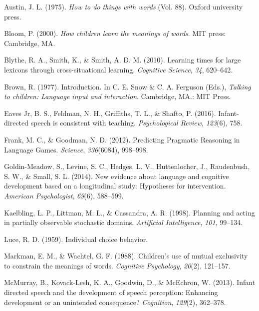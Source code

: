 \documentclass[10pt, letterpaper]{article}
\begin{document}
\noindent

\hypertarget{refs}{}
\hypertarget{ref-austin1975}{}
Austin, J. L. (1975). \emph{How to do things with words} (Vol. 88).
Oxford university press.

\hypertarget{ref-bloom2000}{}
Bloom, P. (2000). \emph{How children learn the meanings of words}. MIT
press: Cambridge, MA.

\hypertarget{ref-blythe2010}{}
Blythe, R. A., Smith, K., \& Smith, A. D. M. (2010). Learning times for
large lexicons through cross-situational learning. \emph{Cognitive
Science}, \emph{34}, 620--642.

\hypertarget{ref-brown1977}{}
Brown, R. (1977). Introduction. In C. E. Snow \& C. A. Ferguson (Eds.),
\emph{Talking to children: Language input and interaction}. Cambridge,
MA.: MIT Press.

\hypertarget{ref-eaves-jr2016}{}
Eaves Jr, B. S., Feldman, N. H., Griffiths, T. L., \& Shafto, P. (2016).
Infant-directed speech is consistent with teaching. \emph{Psychological
Review}, \emph{123}(6), 758.

\hypertarget{ref-frank2012}{}
Frank, M. C., \& Goodman, N. D. (2012). Predicting Pragmatic Reasoning
in Language Games. \emph{Science}, \emph{336}(6084), 998--998.

\hypertarget{ref-goldin-meadow2014}{}
Goldin-Meadow, S., Levine, S. C., Hedges, L. V., Huttenlocher, J.,
Raudenbush, S. W., \& Small, S. L. (2014). New evidence about language
and cognitive development based on a longitudinal study: Hypotheses for
intervention. \emph{American Psychologist}, \emph{69}(6), 588--599.

\hypertarget{ref-kaelbling1998}{}
Kaelbling, L. P., Littman, M. L., \& Cassandra, A. R. (1998). Planning
and acting in partially observable stochastic domains. \emph{Artificial
Intelligence}, \emph{101}, 99--134.

\hypertarget{ref-luce1959}{}
Luce, R. D. (1959). Individual choice behavior.

\hypertarget{ref-markman1988}{}
Markman, E. M., \& Wachtel, G. F. (1988). Children's use of mutual
exclusivity to constrain the meanings of words. \emph{Cognitive
Psychology}, \emph{20}(2), 121--157.

\hypertarget{ref-mcmurray2013}{}
McMurray, B., Kovack-Lesh, K. A., Goodwin, D., \& McEchron, W. (2013).
Infant directed speech and the development of speech perception:
Enhancing development or an unintended consequence? \emph{Cognition},
\emph{129}(2), 362--378.
\end{document}
